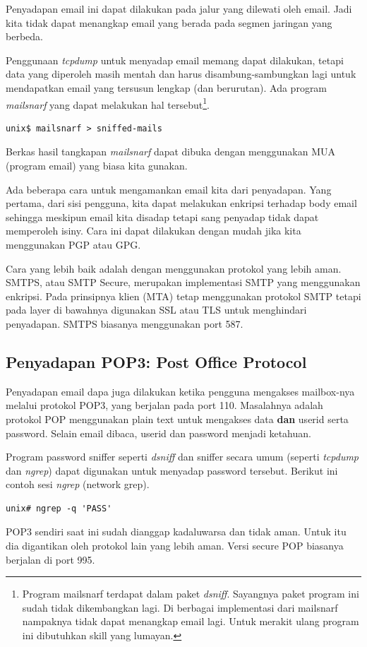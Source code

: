 Penyadapan email ini dapat dilakukan pada jalur yang dilewati oleh email. Jadi
kita tidak dapat menangkap email yang berada pada segmen jaringan yang berbeda.

Penggunaan {\em tcpdump} untuk menyadap email memang dapat dilakukan, tetapi
data yang diperoleh masih mentah dan harus disambung-sambungkan lagi untuk
mendapatkan email yang tersusun lengkap (dan berurutan). Ada program {\em
mailsnarf} yang dapat melakukan hal tersebut\footnote{Program mailsnarf
terdapat dalam paket {\em dsniff}. Sayangnya paket program ini sudah tidak
dikembangkan lagi. Di berbagai implementasi dari mailsnarf nampaknya tidak
dapat menangkap email lagi. Untuk merakit ulang program ini dibutuhkan skill
yang lumayan.}.

\begin{verbatim}
unix$ mailsnarf > sniffed-mails
\end{verbatim}

Berkas hasil tangkapan {\em mailsnarf} dapat dibuka dengan menggunakan MUA
(program email) yang biasa kita gunakan.

Ada beberapa cara untuk mengamankan email kita dari penyadapan. Yang pertama,
dari sisi pengguna, kita dapat melakukan enkripsi terhadap body email sehingga
meskipun email kita disadap tetapi sang penyadap tidak dapat memperoleh isiny.
Cara ini dapat dilakukan dengan mudah jika kita menggunakan PGP atau GPG.

Cara yang lebih baik adalah dengan menggunakan protokol yang lebih aman. SMTPS,
atau SMTP Secure, merupakan implementasi SMTP yang menggunakan enkripsi. Pada
prinsipnya klien (MTA) tetap menggunakan protokol SMTP tetapi pada layer di
bawahnya digunakan SSL atau TLS untuk menghindari penyadapan. SMTPS biasanya
menggunakan port 587.

\subsection{Penyadapan POP3: Post Office Protocol}

Penyadapan email dapa juga dilakukan ketika pengguna mengakses mailbox-nya
melalui protokol POP3, yang berjalan pada port 110. Masalahnya adalah protokol
POP menggunakan plain text untuk mengakses data {\bf dan} userid serta
password. Selain email dibaca, userid dan password menjadi ketahuan.

Program password sniffer seperti {\em dsniff} dan sniffer secara umum (seperti
{\em tcpdump} dan {\em ngrep}) dapat digunakan untuk menyadap password
tersebut. Berikut ini contoh sesi {\em ngrep} (network grep).

\begin{mdframed}
\begin{verbatim}
unix# ngrep -q 'PASS'
\end{verbatim}
\end{mdframed}

POP3 sendiri saat ini sudah dianggap kadaluwarsa dan tidak aman. Untuk itu dia
digantikan oleh protokol lain yang lebih aman. Versi secure POP biasanya
berjalan di port 995.
